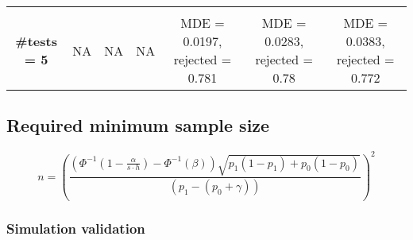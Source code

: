 \documentclass[
]{article}
\begin{document}
\begin{longtable}[]{@{}ccccccc@{}}
\begin{minipage}[t]{0.16\columnwidth}
\end{minipage}\tabularnewline
\begin{minipage}[t]{0.08\columnwidth}\centering
\textbf{\#tests = 5}\strut
\end{minipage} & \begin{minipage}[t]{0.08\columnwidth}\centering
NA\strut
\end{minipage} & \begin{minipage}[t]{0.08\columnwidth}\centering
NA\strut
\end{minipage} & \begin{minipage}[t]{0.08\columnwidth}\centering
NA\strut
\end{minipage} & \begin{minipage}[t]{0.16\columnwidth}\centering
MDE = 0.0197, rejected = 0.781\strut
\end{minipage} & \begin{minipage}[t]{0.16\columnwidth}\centering
MDE = 0.0283, rejected = 0.78\strut
\end{minipage} & \begin{minipage}[t]{0.16\columnwidth}\centering
MDE = 0.0383, rejected = 0.772\strut
\end{minipage}\tabularnewline
\bottomrule
\end{longtable}

\hypertarget{required-minimum-sample-size-1}{%
\subsection{Required minimum sample
size}\label{required-minimum-sample-size-1}}

\[\boxed{n = \left(\frac{\left(\Phi^{-1}(1 - \frac{\alpha}{s \cdot h}) - \Phi^{-1}(\beta)\right)\sqrt{p_1(1-p_1) + p_0(1-p_0)}}{(p_1 - (p_0 + \gamma))}\right)^2}\]

\hypertarget{simulation-validation-3}{%
\subsubsection{Simulation validation}\label{simulation-validation-3}}
\end{document}
